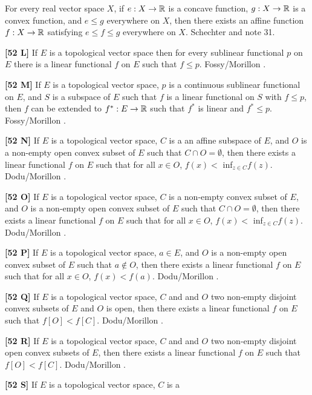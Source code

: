 For every real vector space $X$, if
$e: X\to {\Bbb R}$ is a concave function, $g: X\to {\Bbb R}$ is a convex
function, and $e\le g$ everywhere on $X$, then there exists an affine
function $f: X \to {\Bbb R}$ satisfying $e \le f \le g$ everywhere on
$X$.  \ac{Schechter} \cite{1996b} and note 31.
\smallskip
\item{}{\bf [52 L]} If $E$ is a topological vector space then for every
sublinear functional $p$ on $E$ there is a linear functional $f$ on $E$
such that $f\le p$. \ac{Fossy/Morillon} \cite{1998}.
\smallskip
\item{}{\bf [52 M]}  If $E$ is a topological vector space, $p$
is a continuous sublinear functional on $E$, and  $S$ is a subspace of
$E$ such that $f$ is a linear functional on $S$ with $f\le p$, then
$f$ can be extended to $f^{*} : E \rightarrow {\Bbb R}$ such that
$f^{*}$ is linear and $f^*\le p$. \ac{Fossy/Morillon} \cite{1998}.
\smallskip
\item{}{\bf [52 N]} If $E$ is a topological vector space, $C$ is a
an affine subspace of $E$, and $O$ is a non-empty open convex
subset of $E$ such that $C\cap O=\emptyset$, then there exists a
linear functional $f$ on $E$ such that for all $x\in O$, $f(x) <$
inf$_{z\in C}f(z)$. \ac{Dodu/Morillon} \cite{1999}.
\smallskip
\item{}{\bf [52 O]} If $E$ is a topological vector space, $C$ is a
non-empty convex subset of $E$, and $O$ is a non-empty open convex
subset of $E$ such that $C\cap O=\emptyset$, then there exists a
linear functional $f$ on $E$ such that for all $x\in O$, $f(x) <$
inf$_{z\in C}f(z)$. \ac{Dodu/Morillon} \cite{1999}.
\smallskip
\item{}{\bf [52 P]} If $E$ is a topological vector space, $a\in E$,
and $O$ is a non-empty open convex subset of $E$ such that $a\notin O$,
then there exists a linear functional $f$ on $E$ such that for all
$x\in O$, $f(x) < f(a)$. \ac{Dodu/Morillon} \cite{1999}.
\smallskip
\item{}{\bf [52 Q]} If $E$ is a topological vector space, $C$ and
and $O$ two non-empty disjoint convex subsets of $E$ and $O$ is open,
then there exists a linear functional $f$ on $E$ such that $f[O] <
f[C]$. \ac{Dodu/Morillon} \cite{1999}.
\smallskip
\item{}{\bf [52 R]} If $E$ is a topological vector space, $C$ and
and $O$ two non-empty disjoint open convex subsets of $E$, then there
exists a linear functional $f$ on $E$ such that $f[O] < f[C]$.
\ac{Dodu/Morillon} \cite{1999}.
\smallskip
\item{}{\bf [52 S]} If $E$ is a topological vector space, $C$ is a
